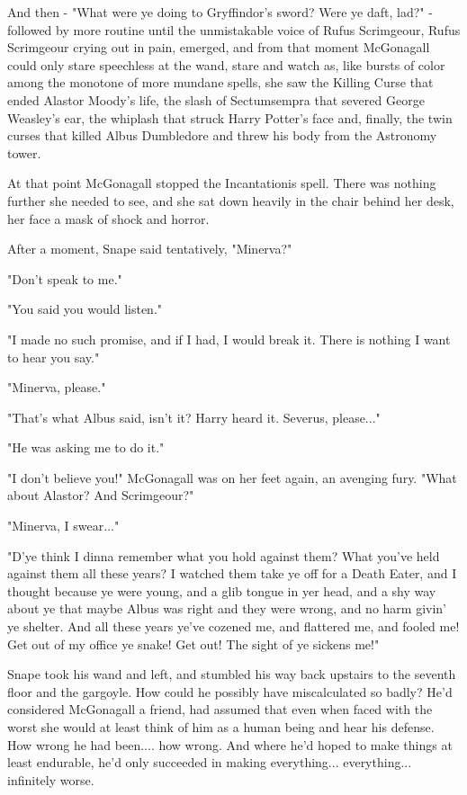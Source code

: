 And then - "What were ye doing to Gryffindor's sword? Were ye daft, lad?" - followed by more routine until the unmistakable voice of Rufus Scrimgeour, Rufus Scrimgeour crying out in pain, emerged, and from that moment McGonagall could only stare speechless at the wand, stare and watch as, like bursts of color among the monotone of more mundane spells, she saw the Killing Curse that ended Alastor Moody's life, the slash of Sectumsempra that severed George Weasley's ear, the whiplash that struck Harry Potter's face and, finally, the twin curses that killed Albus Dumbledore and threw his body from the Astronomy tower.

At that point McGonagall stopped the Incantationis spell. There was nothing further she needed to see, and she sat down heavily in the chair behind her desk, her face a mask of shock and horror.

After a moment, Snape said tentatively, "Minerva?"

"Don't speak to me."

"You said you would listen."

"I made no such promise, and if I had, I would break it. There is nothing I want to hear you say."

"Minerva, please."

"That's what Albus said, isn't it? Harry heard it. Severus, please..."

"He was asking me to do it."

"I don't believe you!" McGonagall was on her feet again, an avenging fury. "What about Alastor? And Scrimgeour?"

"Minerva, I swear..."

"D'ye think I dinna remember what you hold against them? What you've held against them all these years? I watched them take ye off for a Death Eater, and I thought because ye were young, and a glib tongue in yer head, and a shy way about ye that maybe Albus was right and they were wrong, and no harm givin' ye shelter. And all these years ye've cozened me, and flattered me, and fooled me! Get out of my office ye snake! Get out! The sight of ye sickens me!"

Snape took his wand and left, and stumbled his way back upstairs to the seventh floor and the gargoyle. How could he possibly have miscalculated so badly? He'd considered McGonagall a friend, had assumed that even when faced with the worst she would at least think of him as a human being and hear his defense. How wrong he had been.... how wrong. And where he'd hoped to make things at least endurable, he'd only succeeded in making everything... everything... infinitely worse.

